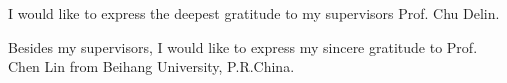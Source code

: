 \begin{acknowledgments}
I would like to express the deepest gratitude to my supervisors Prof. Chu Delin.

Besides my supervisors, I would like to express my sincere gratitude to Prof.
Chen Lin from Beihang University, P.R.China.


\begin{flushright}
  \textbf{\theauthor}\\
  \textbf{\the\year}
\end{flushright}

\end{acknowledgments}


